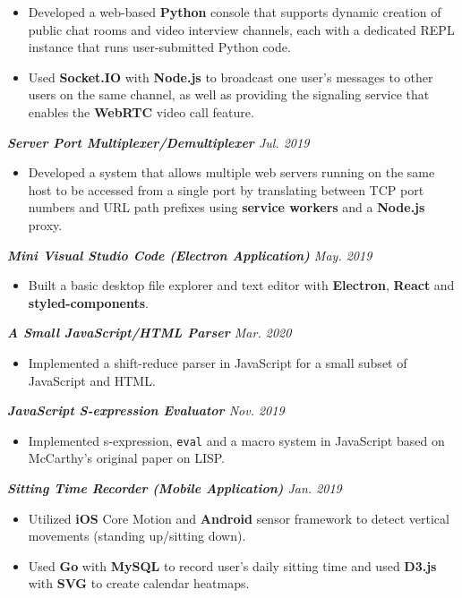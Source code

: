 \documentclass[10pt]{article}
\begin{document}
\begin{itemize}[leftmargin=15pt, noitemsep, topsep=0pt]
\item Developed a web-based \textbf{Python} console that supports dynamic creation of public chat rooms and video interview channels, each with a dedicated REPL instance that runs user-submitted Python code.
\item Used \textbf{Socket.IO} with \textbf{Node.js} to broadcast one user’s messages to other users on the same channel, as well as providing the signaling service that enables the \textbf{WebRTC} video call feature.
\end{itemize}
\vspace{0.5em}
%
{\itshape {\bfseries Server Port Multiplexer/Demultiplexer}  \hfill Jul. 2019}
\begin{itemize}[leftmargin=15pt, noitemsep, topsep=0pt]
\item Developed a system that allows multiple web servers running on the same host to be accessed from a single port by translating between TCP port numbers and URL path prefixes using \textbf{service workers} and a \textbf{Node.js} proxy.
\end{itemize}
\vspace{0.2em}
%
{\itshape {\bfseries Mini Visual Studio Code (Electron Application)}  \hfill May. 2019}
\begin{itemize}[leftmargin=15pt, noitemsep, topsep=0pt]
\item Built a basic desktop file explorer and text editor with \textbf{Electron}, \textbf{React} and \textbf{styled-components}.
\end{itemize}
\vspace{0.2em}
%
{\itshape {\bfseries A Small JavaScript/HTML Parser} \hfill Mar. 2020}
\begin{itemize}[leftmargin=15pt, noitemsep, topsep=0pt]
\item Implemented a shift-reduce parser in JavaScript for a small subset of JavaScript and HTML.
\end{itemize}
\vspace{0.2em}
%
{\itshape {\bfseries JavaScript S-expression Evaluator} \hfill Nov. 2019}
\begin{itemize}[leftmargin=15pt, noitemsep, topsep=0pt]
\item Implemented s-expression, \texttt{eval} and a macro system in JavaScript based on McCarthy's original paper on LISP.
\end{itemize}
\vspace{0.2em}
%
{\itshape {\bfseries Sitting Time Recorder (Mobile Application)}  \hfill Jan. 2019}
\begin{itemize}[leftmargin=15pt, noitemsep, topsep=0pt]
\item Utilized \textbf{iOS} Core Motion and \textbf{Android} sensor framework to detect vertical movements (standing up/sitting down).
\item Used \textbf{Go} with \textbf{MySQL} to record user's daily sitting time and used \textbf{D3.js} with \textbf{SVG} to create calendar heatmaps.
\end{itemize}
%
\vspace{-0.5em}
\end{document}
